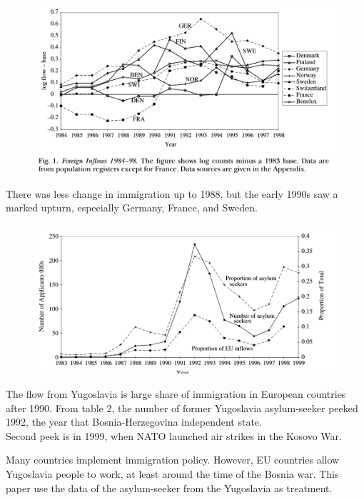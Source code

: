 \documentclass[../root]{subfiles}
\begin{document}
    \begin{figure}[h]
        \includegraphics[width=15cm]{0529sugiyama/Figure1.png}
    \end{figure}
    There was less change in immigration up to 1988, but the early 1990s saw a marked upturn, especially Germany, France, and Sweden.
    \begin{figure}[h]
        \includegraphics[width=15cm]{0529sugiyama/Figure2.png}
    \end{figure}
    The flow from Yugoslavia is large share of immigration in European countries after 1990.
    From table 2, the number of former Yugoslavia asylum-seeker peeked 1992, the year that Bosnia-Herzegovina independent state. \\
    Second peek is in 1999, when NATO launched air strikes in the Kosovo War.

    Many countries implement immigration policy. However, EU countries allow  Yugoslavia people to work, at least around the time of the Bosnia war. This paper use the data of the asylum-seeker from the Yugoslavia as treatment.
\end{document}
